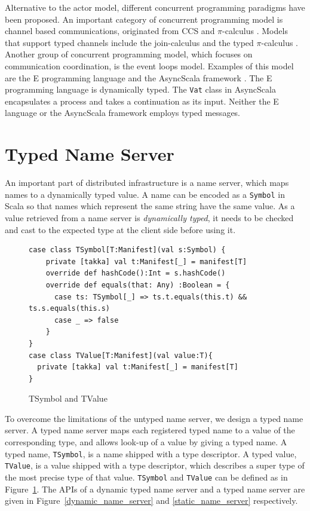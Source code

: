 Alternative to the actor model, different concurrent programming paradigms have been proposed.
An important category of concurrent programming model is channel based communications,
originated from CCS \cite{milner1980calculus} and $\pi$-calculus \cite{pi_book}.
Models that support typed channels include
the join-calculus \cite{full_join} and the typed $\pi$-calculus \cite{pi_book}.
Another group of concurrent programming model, which focuses on communication coordination,
is the event loops model.   Examples of this model are the E programming
language \cite{miller2005concurrency} and the AsyncScala framework \cite{asyncscala}.
The E programming language is dynamically typed.  The {\tt Vat} class
in AsyncScala encapsulates a process and takes a continuation as its input.
Neither the E language or the AsyncScala framework employs typed messages.





\section{Typed Name Server}
\label{nameserver}

An important part of distributed infrastructure is a name server, 
which maps names to a dynamically typed value.  
A name can be encoded as a {\tt Symbol} in Scala so that names
which represent the same string have the same value.  As a value retrieved from 
a name server is {\it dynamically typed}, it needs to be checked and 
cast to the expected type at the client side before using it.  

\begin{figure}[b]
\label{tsymbol}
\begin{lstlisting}
case class TSymbol[T:Manifest](val s:Symbol) {
    private [takka] val t:Manifest[_] = manifest[T]
    override def hashCode():Int = s.hashCode()  
    override def equals(that: Any) :Boolean = {
      case ts: TSymbol[_] => ts.t.equals(this.t) && ts.s.equals(this.s)
      case _ => false
    }
}
case class TValue[T:Manifest](val value:T){
  private [takka] val t:Manifest[_] = manifest[T]
}
\end{lstlisting}
\caption{TSymbol and TValue}
\vspace{-10pt}
\end{figure}

To overcome the limitations of the untyped name server, we design 
a typed name server.  A typed name server maps each registered typed name to a value of the
corresponding type, and allows look-up of a value by giving a typed name.
A typed name, {\tt TSymbol}, is a name shipped with a type descriptor.  A 
typed value, {\tt TValue}, is a value shipped with a type descriptor, which
describes a super type of the most precise type of that value.  
{\tt TSymbol} and {\tt TValue} can be defined as in Figure~\ref{tsymbol}.
The APIs of a dynamic typed name server and a typed name server 
are given in Figure~\ref{dynamic_name_server} and \ref{static_name_server} respectively.





